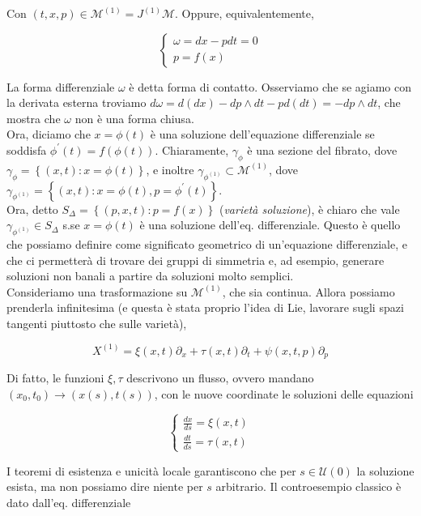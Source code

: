 \documentclass{report}
\begin{document}
Con $(t,x, p) \in \mathcal{M}^{(1)} = J^{(1)}\mathcal{M}$. 
Oppure, equivalentemente, 

\[\begin{cases}
    \omega = dx - pdt = 0  \\
    p = f(x)
\end{cases}\]

La forma differenziale $\omega$ è detta forma di contatto. Osserviamo che se agiamo con la derivata esterna troviamo $d\omega = d(dx) -dp \wedge dt - pd(dt) = -dp \wedge dt$, che mostra che $\omega$ non è una forma chiusa. \\

Ora, diciamo che $x = \phi(t)$ è una soluzione dell'equazione differenziale se soddisfa $\phi^{'}(t) = f(\phi(t))$. Chiaramente, $\gamma_\phi$ è una sezione del fibrato, dove $\gamma_\phi = \left\{(x,t) : x = \phi(t)\right\}$, e inoltre $\gamma_{\phi^{(1)}} \subset \mathcal{M}^{(1)}$, dove $\gamma_{\phi^{(1)}} = \left\{(x,t) : x = \phi(t), p = \phi^{'}(t)\right\}$. \\

Ora, detto $S_{\Delta} = \left\{(p, x, t) : p = f(x)\right\}$ (\emph{varietà soluzione}), è chiaro che vale $\gamma_{\phi^{(1)}} \in S_\Delta $ s.se $x = \phi(t)$ è una soluzione dell'eq. differenziale. Questo è quello che possiamo definire come significato geometrico di un'equazione differenziale, e che ci permetterà di trovare dei gruppi di simmetria e, ad esempio, generare soluzioni non banali a partire da soluzioni molto semplici. \\

Consideriamo una trasformazione su $\mathcal{M}^{(1)}$, che sia continua. Allora possiamo prenderla infinitesima (e questa è stata proprio l'idea di Lie, lavorare sugli spazi tangenti piuttosto che sulle varietà), 

\begin{equation}
    X^{(1)} = \xi(x, t)\partial_x + \tau(x, t)\partial_t + \psi(x, t, p)\partial_p
\end{equation}

Di fatto, le funzioni $\xi, \tau$ descrivono un flusso, ovvero mandano $(x_0, t_0) \rightarrow (x(s), t(s))$, con le nuove coordinate le soluzioni delle equazioni 

\[\begin{cases}
    \frac{dx}{ds} = \xi(x, t) \\
    \frac{dt}{ds} = \tau(x, t)
\end{cases}\]

I teoremi di esistenza e unicità locale garantiscono che per $s \in \mathcal{U}(0)$ la soluzione esista, ma non possiamo dire niente per $s$ arbitrario. Il controesempio classico è dato dall'eq. differenziale
\end{document}
